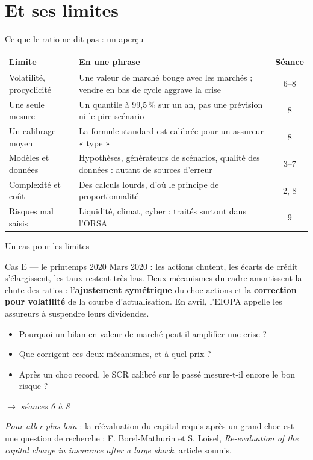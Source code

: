 \documentclass[10pt,aspectratio=169]{beamer}
\newenvironment{cas}[2]{\begin{exampleblock}{Cas #1 --- #2}}{\end{exampleblock}}
\begin{document}
\section{Et ses limites}

\begin{frame}{Ce que le ratio ne dit pas : un aperçu}
\begin{table}
\centering
\small
\renewcommand{\arraystretch}{1.3}
\begin{tabular}{p{4.1cm}p{7.6cm}c}
\toprule
\textbf{Limite} & \textbf{En une phrase} & \textbf{Séance} \\
\midrule
Volatilité, procyclicité & Une valeur de marché bouge avec les marchés ; vendre en bas de cycle aggrave la crise & 6--8 \\
Une seule mesure & Un quantile à 99,5\,\% sur un an, pas une prévision ni le pire scénario & 8 \\
Un calibrage moyen & La formule standard est calibrée pour un assureur « type » & 8 \\
Modèles et données & Hypothèses, générateurs de scénarios, qualité des données : autant de sources d'erreur & 3--7 \\
Complexité et coût & Des calculs lourds, d'où le principe de proportionnalité & 2, 8 \\
Risques mal saisis & Liquidité, climat, cyber : traités surtout dans l'ORSA & 9 \\
\bottomrule
\end{tabular}
\end{table}
\end{frame}

\begin{frame}{Un cas pour les limites}
\begin{cas}{E}{le printemps 2020}
Mars 2020 : les actions chutent, les écarts de crédit s'élargissent, les taux restent très bas.
Deux mécanismes du cadre amortissent la chute des ratios : l'\textbf{ajustement symétrique} du
choc actions et la \textbf{correction pour volatilité} de la courbe d'actualisation. En avril,
l'EIOPA appelle les assureurs à suspendre leurs dividendes.
\begin{itemize}
  \item Pourquoi un bilan en valeur de marché peut-il amplifier une crise ?
  \item Que corrigent ces deux mécanismes, et à quel prix ?
  \item Après un choc record, le SCR calibré sur le passé mesure-t-il encore le bon risque ?
\end{itemize}
\hfill \emph{$\to$ séances 6 à 8}
\end{cas}
\vspace{0.1cm}
\small \emph{Pour aller plus loin} : la réévaluation du capital requis après un grand choc est
une question de recherche ; F. Borel-Mathurin et S. Loisel, \emph{Re-evaluation of the capital charge
in insurance after a large shock}, article soumis.
\end{frame}
\end{document}
